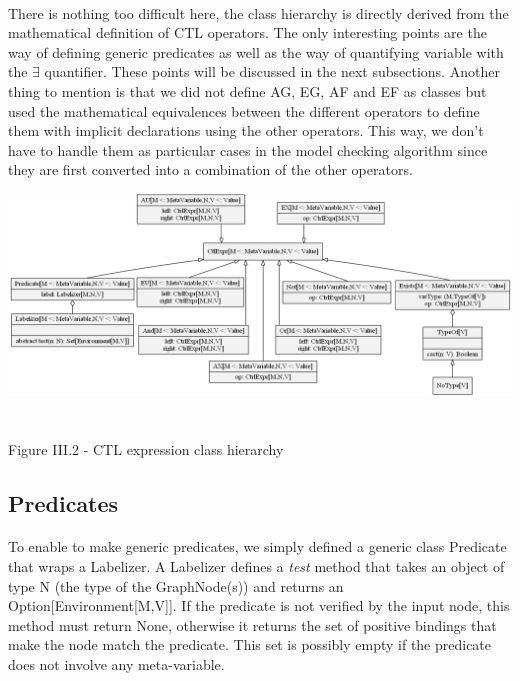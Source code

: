 \documentclass{report}
\begin{document}
\paragraph{}
\hspace{4mm}There is nothing too difficult here, the class hierarchy is directly derived from the mathematical
definition of CTL operators. The only interesting points are the way of defining generic predicates as well as the way of quantifying variable with the $\exists$ quantifier. These points
will be discussed in the next subsections. Another thing to mention is that we did not define AG, EG, AF and EF as classes but used the mathematical equivalences between the different operators
to define them with implicit declarations using the other operators. This way, we don't have to handle them as particular cases in the model checking algorithm since they are first converted into
a combination of the other operators.

\begin{center}
\includegraphics[scale=0.4]{data/CTL_expr.png}
~\\~\\Figure III.2 - CTL expression class hierarchy
\end{center}

\subsection* {Predicates}
\paragraph{}
\hspace{4mm}To enable to make generic predicates, we simply defined a generic class Predicate that wraps a Labelizer. A Labelizer
defines a \textit{test} method that takes an object of type N (the type of the GraphNode(s)) and returns an Option[Environment[M,V]].
If the predicate is not verified by the input node, this method must return None, otherwise it returns the set of positive bindings that make the node
match the predicate. This set is possibly empty if the predicate does not involve any meta-variable.
\end{document}
